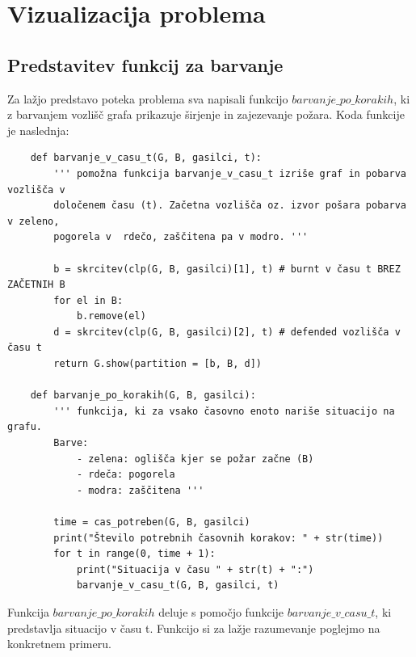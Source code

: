 \documentclass[a4paper, 12pt]{article}
\begin{document}
\pagebreak


\section{Vizualizacija problema}

\subsection{Predstavitev funkcij za barvanje}

\noindent Za lažjo predstavo poteka problema sva napisali funkcijo $barvanje\_po\_korakih$, ki z barvanjem
vozlišč grafa prikazuje širjenje in zajezevanje požara. Koda funkcije je naslednja:

\begin{verbatim}
    def barvanje_v_casu_t(G, B, gasilci, t):
        ''' pomožna funkcija barvanje_v_casu_t izriše graf in pobarva vozlišča v 
        določenem času (t). Začetna vozlišča oz. izvor pošara pobarva v zeleno, 
        pogorela v  rdečo, zaščitena pa v modro. '''

        b = skrcitev(clp(G, B, gasilci)[1], t) # burnt v času t BREZ ZAČETNIH B
        for el in B:
            b.remove(el)
        d = skrcitev(clp(G, B, gasilci)[2], t) # defended vozlišča v času t
        return G.show(partition = [b, B, d])

    def barvanje_po_korakih(G, B, gasilci):
        ''' funkcija, ki za vsako časovno enoto nariše situacijo na grafu.
        Barve:
            - zelena: oglišča kjer se požar začne (B)
            - rdeča: pogorela
            - modra: zaščitena '''

        time = cas_potreben(G, B, gasilci)
        print("Število potrebnih časovnih korakov: " + str(time))
        for t in range(0, time + 1):
            print("Situacija v času " + str(t) + ":")
            barvanje_v_casu_t(G, B, gasilci, t)    
\end{verbatim}

\noindent Funkcija $barvanje\_po\_korakih$ deluje s pomočjo funkcije $barvanje\_v\_casu\_t$, ki predstavlja
situacijo v času t. Funkcijo si za lažje razumevanje poglejmo na konkretnem primeru.
\end{document}
